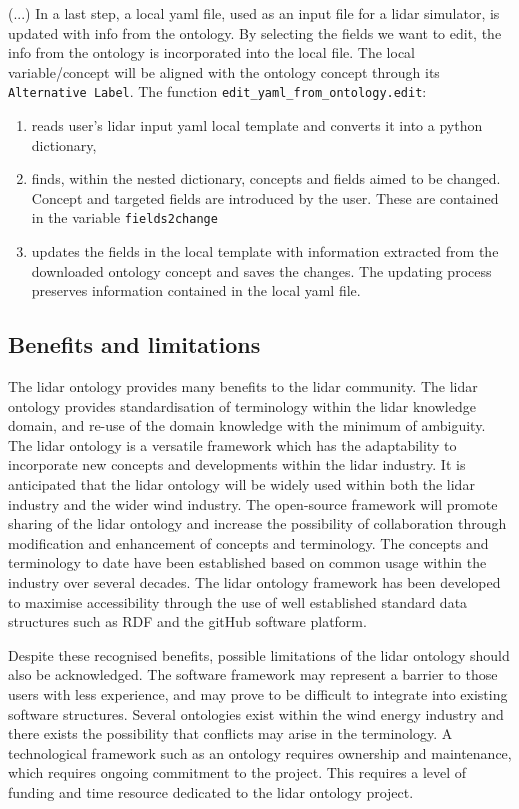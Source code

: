 \documentclass[remotesensing,article,submit,pdftex,moreauthors]{Definitions/mdpi}
\begin{document}
(...) In a last step, a local yaml file, used as an input file for a lidar simulator, is updated with info from the ontology. By selecting the fields we want to edit, the info from the ontology is incorporated into the local file. The local variable/concept will be aligned with the ontology concept through its \texttt{Alternative Label}. The function  \texttt{edit\_yaml\_from\_ontology.edit}:
\begin{enumerate}
    \item reads user's lidar input yaml local template and converts it into a python dictionary,
    \item finds, within the nested dictionary, concepts and fields aimed to be changed. Concept and targeted fields are introduced by the user. These are contained in the variable \texttt{fields2change}
    \item updates the fields in the local template with information extracted from the downloaded ontology concept and saves the changes. The updating process preserves information contained in the local yaml file. 
    
\end{enumerate} 




\subsection{Benefits and limitations}
The lidar ontology provides many benefits to the lidar community.
The lidar ontology provides standardisation of terminology within the lidar knowledge domain, and re-use of the domain knowledge with the minimum of ambiguity.
The lidar ontology is a versatile framework which has the adaptability to incorporate new concepts and developments within the lidar industry.
It is anticipated that the lidar ontology will be widely used within both the lidar industry and the wider wind industry.
The open-source framework will promote sharing of the lidar ontology and increase the possibility of collaboration through modification and enhancement of concepts and terminology. 
The concepts and terminology to date have been established based on common usage within the industry over several decades.
The lidar ontology framework has been developed to maximise accessibility through the use of well established standard data structures such as RDF and the gitHub software platform.

Despite these recognised benefits, possible limitations of the lidar ontology should also be acknowledged.
The software framework may represent a barrier to those users with less experience, and may prove to be difficult to integrate into existing software structures.
Several ontologies exist within the wind energy industry and there exists the possibility that conflicts may arise in the terminology.
A technological framework such as an ontology requires ownership and maintenance, which requires ongoing commitment to the project.
This requires a level of funding and time resource dedicated to the lidar ontology project. 
\end{document}
